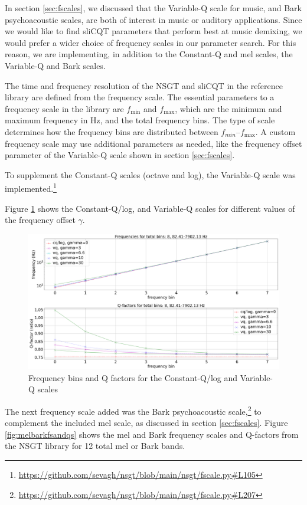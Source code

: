 \documentclass[report.tex]{subfiles}
\begin{document}
In section \ref{sec:fscales}, we discussed that the Variable-Q scale for music, and Bark psychoacoustic scales, are both of interest in music or auditory applications. Since we would like to find sliCQT parameters that perform best at music demixing, we would prefer a wider choice of frequency scales in our parameter search. For this reason, we are implementing, in addition to the Constant-Q and mel scales, the Variable-Q and Bark scales.

The time and frequency resolution of the NSGT and sliCQT in the reference library are defined from the frequency scale. The essential parameters to a frequency scale in the library are $f_{\text{min}}$ and $f_{\text{max}}$, which are the minimum and maximum frequency in Hz, and the total frequency bins. The type of scale determines how the frequency bins are distributed between $f_{min}$--$f_{\text{max}}$. A custom frequency scale may use additional parameters as needed, like the frequency offset parameter of the Variable-Q scale shown in section \ref{sec:fscales}.

To supplement the Constant-Q scales (octave and log), the Variable-Q scale was implemented.\footnote{\url{https://github.com/sevagh/nsgt/blob/main/nsgt/fscale.py\#L105}}

Figure \ref{fig:vq} shows the Constant-Q/log, and Variable-Q scales for different values of the frequency offset $\gamma$.

\begin{figure}[ht]
	\centering
	\includegraphics[width=\textwidth]{./images-freqscales/vqlog.png}
	\caption{Frequency bins and Q factors for the Constant-Q/log and Variable-Q scales}
	\label{fig:vq}
\end{figure}

The next frequency scale added was the Bark psychoacoustic scale,\footnote{\url{https://github.com/sevagh/nsgt/blob/main/nsgt/fscale.py\#L207}} to complement the included mel scale, as discussed in section \ref{sec:fscales}. Figure \ref{fig:melbarkfsandqs} shows the mel and Bark frequency scales and Q-factors from the NSGT library for 12 total mel or Bark bands.
\end{document}

